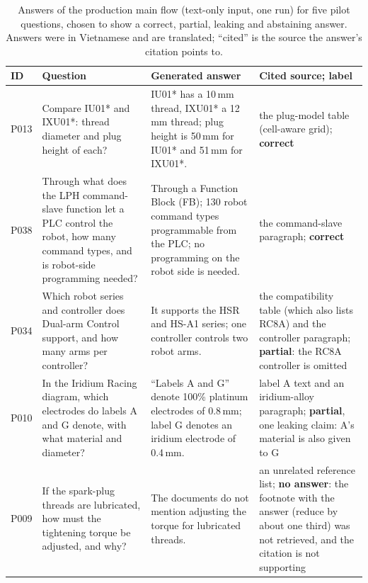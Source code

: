 \begin{table}[t]
\centering\footnotesize
\caption{Answers of the production main flow (text-only input, one run) for five pilot questions, chosen to show a correct, partial, leaking and abstaining answer. Answers were in Vietnamese and are translated; ``cited'' is the source the answer's citation points to.}
\label{tab:answers}
\setlength{\tabcolsep}{4pt}
\begin{tabular}{@{}lp{}p{}p{}@{}}
\toprule
ID & Question & Generated answer & Cited source; label \\
\midrule
P013 & Compare IU01* and IXU01*: thread diameter and plug height of each? & IU01* has a 10\,mm thread, IXU01* a 12\,mm thread; plug height is 50\,mm for IU01* and 51\,mm for IXU01*. & the plug-model table (cell-aware grid); \textbf{correct} \\
P038 & Through what does the LPH command-slave function let a PLC control the robot, how many command types, and is robot-side programming needed? & Through a Function Block (FB); 130 robot command types programmable from the PLC; no programming on the robot side is needed. & the command-slave paragraph; \textbf{correct} \\
P034 & Which robot series and controller does Dual-arm Control support, and how many arms per controller? & It supports the HSR and HS-A1 series; one controller controls two robot arms. & the compatibility table (which also lists RC8A) and the controller paragraph; \textbf{partial}: the RC8A controller is omitted \\
P010 & In the Iridium Racing diagram, which electrodes do labels A and G denote, with what material and diameter? & ``Labels A and G'' denote 100\% platinum electrodes of 0.8\,mm; label G denotes an iridium electrode of 0.4\,mm. & label A text and an iridium-alloy paragraph; \textbf{partial}, one leaking claim: A's material is also given to G \\
P009 & If the spark-plug threads are lubricated, how must the tightening torque be adjusted, and why? & The documents do not mention adjusting the torque for lubricated threads. & an unrelated reference list; \textbf{no answer}: the footnote with the answer (reduce by about one third) was not retrieved, and the citation is not supporting \\
\bottomrule
\end{tabular}
\end{table}


